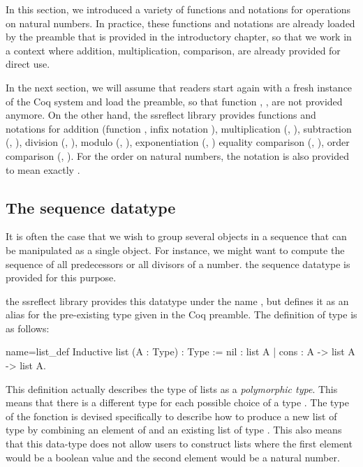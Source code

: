 In this section, we introduced a variety of functions and notations
for operations on natural numbers.  In practice, these functions and
notations are already loaded by the preamble that is provided in the
introductory chapter, so that we work in a context where addition,
multiplication, comparison, are already provided for direct use.

In
the next section, we will assume that readers start again with 
a fresh instance of the Coq system and load the preamble, so that
function , ,  are not provided
anymore.  On the other hand, the ssreflect library provides functions
and notations for addition (function , infix
notation \C{+}), multiplication
(, \C{*}), subtraction (, \C{-}), division (,
\C{\%/}),  modulo (, \C{\%\%}), exponentiation (, \C{\^})
equality comparison (, \C{==}), order
 comparison (, \C{<=}).  For the order on natural numbers,
the notation  is also provided to mean exactly .


\subsection{The sequence datatype}
It is often the case that we wish to group several objects in a
sequence that can be manipulated as a single object.  For instance, we
might want to compute the sequence of all predecessors or all divisors
of a number.  the sequence datatype is provided for this purpose.

the ssreflect library provides this datatype under the name ,
but defines it as an alias for the pre-existing type  given in the
Coq preamble.  The definition of type  is as follows:

\begin{coq}{name=list_def}{}
Inductive list (A : Type) : Type :=
  nil : list A
| cons : A -> list A -> list A.
\end{coq}
This definition actually describes the type of lists as a {\em
  polymorphic type}.  This means that there is a different type
 for each possible choice of a type .  The type of the
fonction  is devised specifically to describe how to produce a
new list of type  by combining an element of  and an
existing list of type .  This also means that this data-type
does not allow users to construct lists where the first element would be
a boolean value and the second element would be a natural number.


